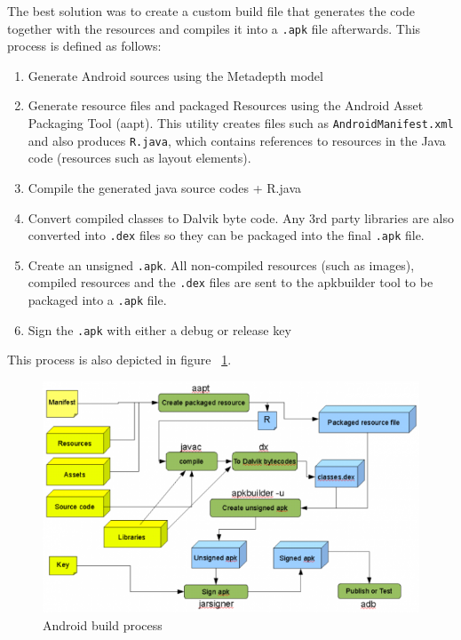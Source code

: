 The best solution was to create a custom build file that generates the code together with the resources and compiles it into a \texttt{.apk} file afterwards. This process is defined as follows:

\begin{enumerate}
\item{Generate Android sources using the Metadepth model}
\item{Generate resource files and packaged Resources using the Android Asset Packaging Tool (aapt). This utility creates files such as \texttt{AndroidManifest.xml} and also produces \texttt{R.java}, which contains references to resources in the Java code (resources such as layout elements).}
\item{Compile the generated java source codes + R.java}
\item{Convert compiled classes to Dalvik byte code. Any 3rd party libraries are also converted into \texttt{.dex} files so they can be packaged into the final \texttt{.apk} file.}
\item{Create an unsigned \texttt{.apk}. All non-compiled resources (such as images), compiled resources and the \texttt{.dex} files are sent to the apkbuilder tool to be packaged into a \texttt{.apk} file.}
\item{Sign the \texttt{.apk} with either a debug or release key}
\end{enumerate}

This process is also depicted in figure ~\ref{fig:android_process}.

\begin{figure}[h!]
\centering
\includegraphics[width=1.0\textwidth]{images/chap6_android_build_process.png}
\caption{Android build process}
\label{fig:android_process}
\end{figure}
